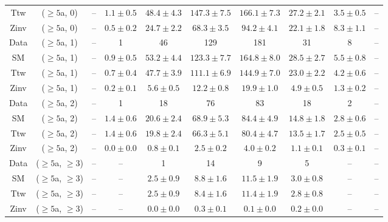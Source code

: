 \begin{table}[h!]
{\begin{tabular}{cccccccccc}
	Ttw & ($\ge5$a, 0) & -- & $1.1\pm 0.5$ & $48.4\pm 4.3$ & $147.3\pm 7.5$ & $166.1\pm 7.3$ & $27.2\pm 2.1$ & $3.5\pm 0.5$ & -- \\[0.5ex] 
	Zinv & ($\ge5$a, 0) & -- & $0.5\pm 0.2$ & $24.7\pm 2.2$ & $68.3\pm 3.5$ & $94.2\pm 4.1$ & $22.1\pm 1.8$ & $8.3\pm 1.1$ & -- \\[0.5ex] 
	Data & ($\ge5$a, 1) & -- & 1 & 46 & 129 & 181 & 31 & 8 & -- \\[0.5ex] 
	SM & ($\ge5$a, 1) & -- & $0.9\pm 0.5$ & $53.2\pm 4.4$ & $123.3\pm 7.7$ & $164.8\pm 8.0$ & $28.5\pm 2.7$ & $5.5\pm 0.8$ & -- \\[0.5ex] 
	Ttw & ($\ge5$a, 1) & -- & $0.7\pm 0.4$ & $47.7\pm 3.9$ & $111.1\pm 6.9$ & $144.9\pm 7.0$ & $23.0\pm 2.2$ & $4.2\pm 0.6$ & -- \\[0.5ex] 
	Zinv & ($\ge5$a, 1) & -- & $0.2\pm 0.1$ & $5.6\pm 0.5$ & $12.2\pm 0.8$ & $19.9\pm 1.0$ & $4.9\pm 0.5$ & $1.3\pm 0.2$ & -- \\[0.5ex] 
	Data & ($\ge5$a, 2) & -- & 1 & 18 & 76 & 83 & 18 & 2 & -- \\[0.5ex] 
	SM & ($\ge5$a, 2) & -- & $1.4\pm 0.6$ & $20.6\pm 2.4$ & $68.9\pm 5.3$ & $84.4\pm 4.9$ & $14.8\pm 1.8$ & $2.8\pm 0.6$ & -- \\[0.5ex] 
	Ttw & ($\ge5$a, 2) & -- & $1.4\pm 0.6$ & $19.8\pm 2.4$ & $66.3\pm 5.1$ & $80.4\pm 4.7$ & $13.5\pm 1.7$ & $2.5\pm 0.5$ & -- \\[0.5ex] 
	Zinv & ($\ge5$a, 2) & -- & $0.0\pm 0.0$ & $0.8\pm 0.1$ & $2.5\pm 0.2$ & $4.0\pm 0.2$ & $1.1\pm 0.1$ & $0.3\pm 0.1$ & -- \\[0.5ex] 
	Data & ($\ge5$a, $\ge3$) & -- & -- & 1 & 14 & 9 & 5 & -- & -- \\[0.5ex] 
	SM & ($\ge5$a, $\ge3$) & -- & -- & $2.5\pm 0.9$ & $8.8\pm 1.6$ & $11.5\pm 1.9$ & $3.0\pm 0.8$ & -- & -- \\[0.5ex] 
	Ttw & ($\ge5$a, $\ge3$) & -- & -- & $2.5\pm 0.9$ & $8.4\pm 1.6$ & $11.4\pm 1.9$ & $2.8\pm 0.8$ & -- & -- \\[0.5ex] 
	Zinv & ($\ge5$a, $\ge3$) & -- & -- & $0.0\pm 0.0$ & $0.3\pm 0.1$ & $0.1\pm 0.0$ & $0.2\pm 0.0$ & -- & -- \\[0.5ex] 
	\hline
	\hline
\end{tabular}}
\end{table}
